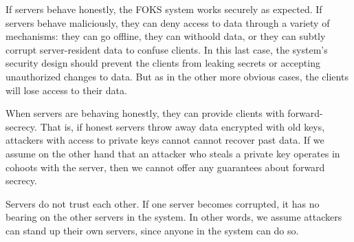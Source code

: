 If servers behave honestly, the FOKS system works securely as expected.  If
servers behave maliciously, they can deny access to data through a variety of
mechanisms: they can go offline, they can withoold data, or they can subtly
corrupt server-resident data to confuse clients. In this last case, the system's
security design should prevent the clients from leaking secrets or accepting
unauthorized changes to data. But as in the other more obvious cases, the
clients will lose access to their data.

When servers are behaving honestly, they can provide clients with
forward-secrecy. That is, if honest servers throw away data encrypted with old
keys, attackers with access to private keys cannot cannot recover past data.  If
we assume on the other hand that an attacker who steals a private key operates
in cohoots with the server, then we cannot offer any guarantees about forward
secrecy.

Servers do not trust each other. If one server becomes corrupted, it has no
bearing on the other servers in the system. In other words, we assume attackers
can stand up their own servers, since anyone in the system can do so.


